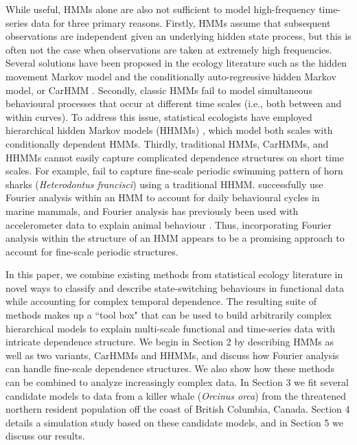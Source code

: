 While useful, HMMs alone are also not sufficient to model high-frequency time-series data for three primary reasons.
%
Firstly, HMMs assume that subsequent observations are independent given an underlying hidden state process, but this is often not the case when observations are taken at extremely high frequencies. 
Several solutions have been proposed in the ecology literature such as the hidden movement Markov model \citep{Whoriskey:2016} and the conditionally auto-regressive hidden Markov model, or CarHMM \citep{Lawler:2019}. 
%
Secondly, classic HMMs fail to model simultaneous behavioural processes that occur at different time scales (i.e., both between and within curves). 
To address this issue, statistical ecologists have employed hierarchical hidden Markov models (HHMMs) \citep{Barajas:2017,Adam:2019}, which model both scales with conditionally dependent HMMs.
%
Thirdly, traditional HMMs, CarHMMs, and HHMMs cannot easily capture complicated dependence structures on short time scales. For example, \citet{Adam:2019} fail to capture fine-scale periodic swimming pattern of horn sharks (\textit{Heterodontus francisci}) using a traditional HHMM. \citet{Heerah:2017} successfully use Fourier analysis within an HMM to account for %
daily behavioural cycles in marine mammals, and Fourier analysis has previously been used with accelerometer data to explain animal behaviour \citep{Fehlmann:2017,Shorter:2017}. Thus, incorporating Fourier analysis within the structure of an HMM appears to be a promising approach to account for fine-scale periodic structures.

In this paper, we combine existing methods from statistical ecology literature in novel ways to classify and describe state-switching behaviours in functional data while accounting for complex temporal dependence. The resulting suite of methods makes up a ``tool box" that can be used to build arbitrarily complex hierarchical models to explain multi-scale functional and time-series data with intricate dependence structure.
We begin in Section 2 by describing HMMs as well as two variants, CarHMMs and HHMMs, and discuss how Fourier analysis can handle fine-scale dependence structures. We also show how these methods can be combined to analyze increasingly complex data. In Section 3 we fit several candidate models to data from a killer whale (\textit{Orcinus orca}) from the threatened northern resident population off the coast of British Columbia, Canada. Section 4 details a simulation study based on these candidate models, and in Section 5 we discuss our results.